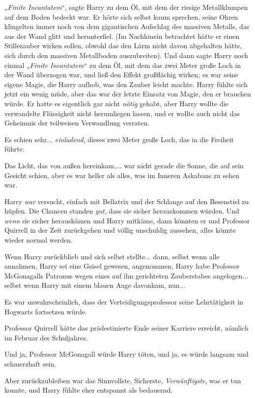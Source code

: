 {„\emph{Finite} \emph{Incantatem}“, sagte Harry zu dem Öl, mit dem der riesige Metallklumpen auf dem Boden bedeckt war. Er hörte sich selbst kaum sprechen, seine Ohren klingelten immer noch von dem gigantischen Aufschlag des massiven Metalls, das aus der Wand glitt und herunterfiel. (Im Nachhinein betrachtet hätte er einen Stillezauber wirken sollen, obwohl das den Lärm nicht davon abgehalten hätte, sich durch den massiven Metallboden auszubreiten). Und dann sagte Harry noch einmal „\emph{Finite} \emph{Incantatem}“ zu dem Öl, mit dem das zwei Meter große Loch in der Wand überzogen war, und ließ den Effekt großflächig wirken; es war seine eigene Magie, die Harry aufhob, was den Zauber leicht machte. Harry fühlte sich jetzt ein wenig müde, aber das war der letzte Einsatz von Magie, den er brauchen würde. Er hatte es eigentlich gar nicht \emph{nötig} gehabt, aber Harry wollte die verwandelte Flüssigkeit nicht herumliegen lassen, und er wollte auch nicht das Geheimnis der teilweisen Verwandlung verraten.

Es schien sehr... \emph{einladend}, dieses zwei Meter große Loch, das in die Freiheit führte.

Das Licht, das von außen hereinkam,... war nicht gerade die Sonne, die auf sein Gesicht schien, aber es war heller als alles, was im Inneren Askabans zu sehen war.

Harry \emph{war} versucht, einfach mit Bellatrix und der Schlange auf den Besenstiel zu hüpfen. Die Chancen standen \emph{gut}, dass sie sicher herauskommen würden. Und \emph{wenn} sie sicher herauskämen und Harry mitkäme, dann könnten er und Professor Quirrell in der Zeit zurückgehen und völlig unschuldig aussehen, alles könnte wieder normal werden.

Wenn Harry zurückblieb und sich selbst stellte... dann, selbst wenn alle annahmen, Harry sei eine Geisel gewesen, angenommen, Harry habe Professor McGonagalls Patronus wegen eines auf ihn gerichteten Zauberstabes angelogen... selbst wenn Harry mit einem blauen Auge davonkam, nun...

Es war unwahrscheinlich, dass der Verteidigungsprofessor seine Lehrtätigkeit in Hogwarts fortsetzen würde.

Professor Quirrell hätte das prädestinierte Ende seiner Karriere erreicht, nämlich im Februar des Schuljahres.

Und ja, Professor McGonagall würde Harry töten, und ja, es würde langsam und schmerzhaft sein.

Aber zurückzubleiben war das Sinnvollste, Sicherste, \emph{Vernünftigste}, was er tun konnte, und Harry fühlte eher entspannt als bedauernd.

}
